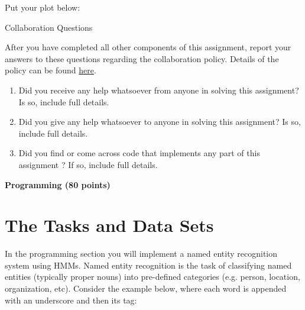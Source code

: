 \documentclass[11pt,addpoints,answers]{exam}
\begin{document}
\begin{questions}
\begin{parts}
\begin{subparts}
\subpart[2] Put your plot below:

    \begin{your_solution}[title=$Plot$,height=10cm,width=15cm]


    \end{your_solution}



\end{subparts}

\end{parts}

\clearpage
{\Large Collaboration Questions}

After you have completed all other components of this assignment, report your answers to these questions regarding the collaboration policy. Details of the policy can be found \href{https://www.cs.cmu.edu/~10601/#policies}{here}.
\begin{enumerate}
    \item Did you receive any help whatsoever from anyone in solving this assignment? Is so, include full details.
    \item Did you give any help whatsoever to anyone in solving this assignment? Is so, include full details.
    \item Did you find or come across code that implements any part of this assignment ? If so, include full details.
\end{enumerate}

\begin{your_solution}[title=Answer,height=10cm,width=15cm]
\end{your_solution}

\clearpage\newpage
\end{questions}

{\LARGE \bf Programming (80 points)}
\label{programming}

\section{The Tasks and Data Sets}\label{dataset}
In the programming section you will implement a named entity recognition system using HMMs. Named entity recognition is the task of classifying named entities (typically proper nouns) into pre-defined categories (e.g. person, location, organization, etc). Consider the example below, where each word is appended with an underscore and then its tag:
\end{document}

